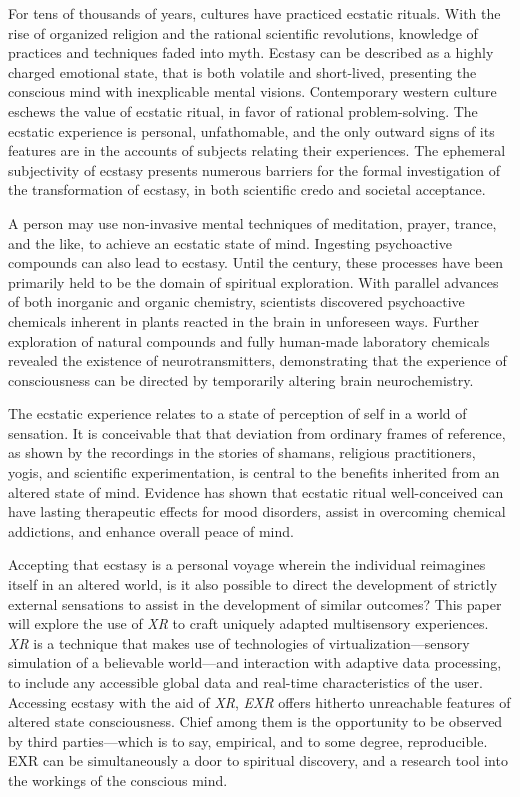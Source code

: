 \documentclass{UIdahoMastersThesis}
\begin{document}
For tens of thousands of years, cultures have practiced ecstatic rituals. With the rise of organized religion and the rational scientific revolutions, knowledge of practices and techniques faded into myth. Ecstasy can be described as a highly charged emotional state, that is both volatile and short-lived, presenting the conscious mind with inexplicable mental visions. Contemporary western culture eschews the value of ecstatic ritual, in favor of rational problem-solving. The ecstatic experience is personal, unfathomable, and the only outward signs of its features are in the accounts of subjects relating their experiences. The ephemeral subjectivity of ecstasy presents numerous barriers for the formal investigation of the transformation of ecstasy, in both scientific credo and societal acceptance. 

A person may use non-invasive mental techniques of meditation, prayer, trance, and the like, to achieve an ecstatic state of mind. Ingesting psychoactive compounds can also lead to ecstasy. Until the  century, these processes have been primarily held to be the domain of spiritual exploration. With parallel advances of both inorganic and organic chemistry, scientists discovered psychoactive chemicals inherent in plants reacted in the brain in unforeseen ways. Further exploration of natural compounds and fully human-made laboratory chemicals revealed the existence of neurotransmitters, demonstrating that the experience of consciousness can be directed by temporarily altering brain neurochemistry.

The ecstatic experience relates to a state of perception of self in a world of sensation. It is conceivable that that deviation from ordinary frames of reference, as shown by the recordings in the stories of shamans, religious practitioners, yogis, and scientific experimentation, is central to the benefits inherited from an altered state of mind. Evidence has shown that ecstatic ritual well-conceived can have lasting therapeutic effects for mood disorders, assist in overcoming chemical addictions, and enhance overall peace of mind.


Accepting that ecstasy is a personal voyage wherein the individual reimagines itself in an altered world, is it also possible to direct the development of strictly external sensations to assist in the development of similar outcomes? This paper will explore the use of \textit{\ac{XR}} to craft uniquely adapted multisensory experiences. \textit{\ac{XR}} is a technique that makes use of technologies of virtualization---sensory simulation of a believable world---and interaction with adaptive data processing, to include any accessible global data and real-time characteristics of the user. Accessing ecstasy with the aid of \textit{\ac{XR}}, \textit{\ac{EXR}} offers hitherto unreachable features of altered state consciousness. Chief among them is the opportunity to be observed by third parties---which is to say, empirical, and to some degree, reproducible. \ac{EXR} can be simultaneously a door to spiritual discovery, and a research tool into the workings of the conscious mind.
\end{document}

